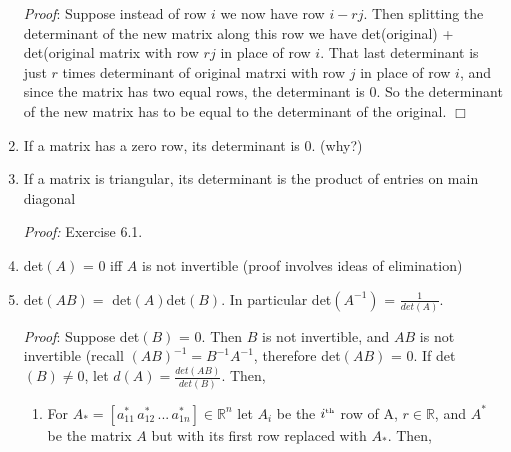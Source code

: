\documentclass[12pt,oneside]{article}
\begin{document}
\begin{enumerate}
  \emph{Proof}: Suppose instead of row $i$ we now have
  row $i - r j$. Then splitting the determinant of the new matrix
  along this row we have det(original) + det(original matrix with row
  $rj$ in place of row $i$. That last determinant is just $r$ times
  determinant of original matrxi with row $j$ in place of row $i$, and
  since the matrix has two equal rows, the determinant is 0. So the determinant of the new matrix has to be equal to the determinant of the original. $\Box$

\item If a matrix has a zero row, its determinant is 0. (why?)
\item If a matrix is triangular, its determinant is the product of
  entries on main diagonal

\emph{Proof:} Exercise 6.1.

\item det$(A)$ = 0 iff $A$ is not invertible (proof involves ideas of
  elimination)
\item det$(AB) = $ det$(A)$det$(B)$. In particular det$(A^{-1})$ =
  $\frac{1}{det(A)}$.

\emph{Proof}: Suppose det$(B)$ = 0. Then
  $B$ is not invertible, and $AB$ is not invertible (recall $(AB)^{-1} = B^{-1}A^{-1}$, therefore det$(AB)$ = 0. If det$(B) \neq 0$, let $d(A) =
  \frac{det(AB)}{det(B)}$. Then,
\begin{enumerate}[(1)]
	\item For $A_*=[a^*_{11} \, a^*_{12} \, ... \, a^*_{1n}] \in \mathbb{R}^n$ let $A_i$ be the \(i^{\text{\tiny{th}}}\) row of A,  \(r \in \mathbb{R}\), and \(A^*\)  be the matrix \(A\) but with its first row replaced with \(A_*\).  Then,



\end{enumerate}
\end{enumerate}
\end{document}
